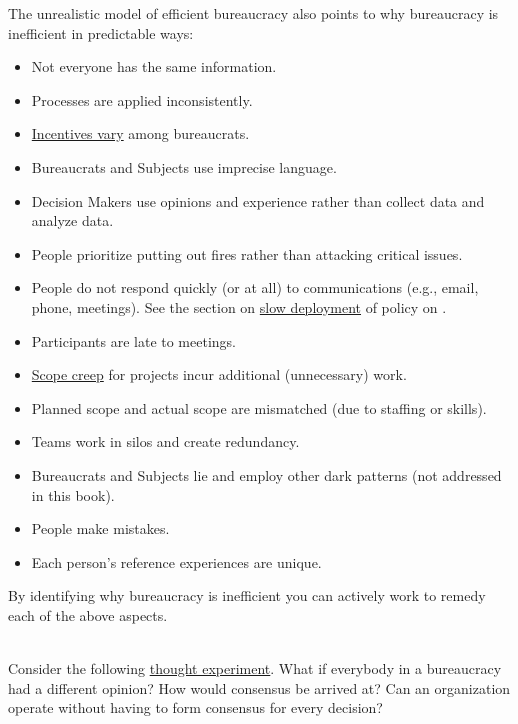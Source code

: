 The unrealistic model of efficient bureaucracy also points to why bureaucracy is inefficient in predictable ways:
\begin{itemize}
    \item Not everyone has the same information.
    \item Processes are applied inconsistently.
    \item \hyperref[sec:motivations]{Incentives vary} among bureaucrats.
    \item Bureaucrats and Subjects use imprecise language.
    \item Decision Makers use opinions and experience rather than collect data and analyze data.
    \item People prioritize putting out fires rather than attacking critical issues.
    \item People do not respond quickly (or at all) to communications (e.g., email, phone, meetings). See the section on \hyperref[sec:slow-deployment]{slow deployment} of policy on \pageref{sec:slow-deployment}. %
    \item Participants are late to meetings.
    \item \href{sec:scope-creep}{Scope creep} for projects incur additional (unnecessary) work.
    \item Planned scope and actual scope are mismatched  (due to staffing or skills).
    \item Teams work in silos and create redundancy.
    \item Bureaucrats and Subjects lie and employ other dark patterns (not addressed in this book).
    \item People make mistakes.
    \item Each person's reference experiences are unique.
\end{itemize}
By identifying why bureaucracy is inefficient you can actively work to remedy each of the above aspects. 

\ \\

Consider the following 
\href{https://en.wikipedia.org/wiki/Thought_experiment}{thought experiment}. 
What if everybody in a bureaucracy had a different opinion? How would consensus be arrived at? Can an organization operate without having to form consensus for every decision? 



